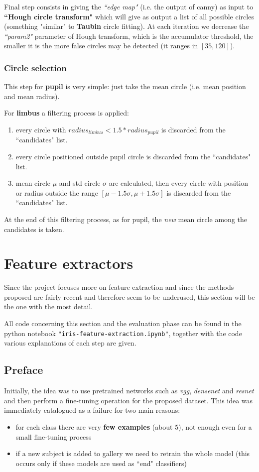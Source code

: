\documentclass{article}
\begin{document}
\bigskip
Final step consists in giving the \textit{``edge map"} (i.e. the output of canny) as input to \textbf{``Hough circle transform"} which will give as output a list of all possible circles (something "similar" to \textbf{Taubin} circle fitting).
At each iteration we decrease the \textit{``param2"} parameter of Hough transform, which is the accumulator threshold, the smaller it is the more false circles may be detected (it ranges in $[35, 120]$).

\subsubsection{Circle selection}
This step for \textbf{pupil} is very simple: just take the mean circle (i.e. mean position and mean radius).

For \textbf{limbus} a filtering process is applied: 
\begin{enumerate}
    \item every circle with $radius_{limbus} < 1.5*radius_{pupil}$ is discarded from the ``candidates" list.
    \item every circle positioned outside pupil circle is discarded from the ``candidates" list. 
    \item mean circle $\mu$ and std circle $\sigma$ are calculated, then every circle with position or radius outside the range $[\mu - 1.5 \sigma, \mu + 1.5 \sigma]$ is discarded from the ``candidates" list. 
\end{enumerate}

At the end of this filtering process, as for pupil, the \textit{new} mean circle among the candidates is taken.

\section{Feature extractors}
Since the project focuses more on feature extraction and since the methods proposed are fairly recent and therefore seem to be underused, this section will be the one with the most detail.

\bigskip
All code concerning this section and the evaluation phase can be found in the python notebook \texttt{"iris-feature-extraction.ipynb"}, together with the code various explanations of each step are given.

\subsection{Preface} 
Initially, the idea was to use pretrained networks such as \textit{vgg}\cite{simonyan2015deep}, \textit{densenet} and \textit{resnet} and then perform a fine-tuning operation for the proposed dataset. This idea was immediately catalogued as a failure for two main reasons:
\begin{itemize}
    \item for each class there are very \textbf{few examples} (about 5), not enough even for a small fine-tuning process
    \item if a new subject is added to gallery we need to retrain the whole model (this occurs only if these models are used as ``end" classifiers)
\end{itemize}
\end{document}
